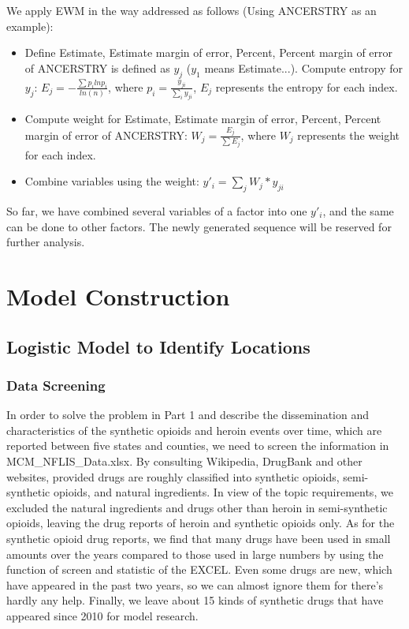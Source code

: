 \documentclass[11pt]{article}
\begin{document}
We apply EWM in the way addressed as follows (Using ANCERSTRY as an example):
\begin{itemize}
	\item Define Estimate, Estimate margin of error, Percent, Percent margin of error of ANCERSTRY is defined as $y_{j}$ ($y_{1}$ means Estimate...). Compute entropy for $y_{j}$: $ E_{j} = -\frac{\sum p_{i}lnp_{i}}{ln(n)}$, where $p_{i}=\frac{y_{ji}}{\sum_{i} y_{ji}}$, $E_{j}$ represents the entropy for each index.
	\item Compute weight for Estimate, Estimate margin of error, Percent, Percent margin of error of ANCERSTRY: $ W_{j} = \frac{E_{j}}{\sum E_{j}}$, where $W_{j}$ represents the weight for each index.
	\item Combine variables using the weight: $y'_{i} = \sum_{j} W_{j} * y_{ji}$
\end{itemize}
So far, we have combined several variables of a factor into one $y'_{i}$, and the same can be done to other factors. The newly generated sequence will be reserved for further analysis.

\section{Model Construction}
\subsection{Logistic Model to Identify Locations}
\subsubsection{Data Screening}
In order to solve the problem in Part 1 and describe the dissemination and characteristics of the synthetic opioids and heroin events over time, which are reported between five states and counties, we need to screen the information in MCM\_NFLIS\_Data.xlsx. By consulting Wikipedia, DrugBank and other websites, provided drugs are roughly classified into synthetic opioids, semi-synthetic opioids, and natural ingredients. In view of the topic requirements, we excluded the natural ingredients and drugs other than heroin in semi-synthetic opioids, leaving the drug reports of heroin and synthetic opioids only. As for the synthetic opioid drug reports, we find that many drugs have been used in small amounts over the years compared to those used in large numbers by using the function of screen and statistic of the EXCEL. Even some drugs are new, which have appeared in the past two years, so we can almost ignore them for there’s hardly any help. Finally, we leave about 15 kinds of synthetic drugs that have appeared since 2010 for model research.
\end{document}
